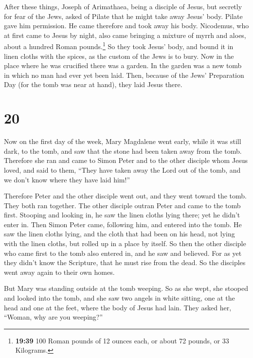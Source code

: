  After these things, Joseph of Arimathaea, being a
disciple of Jesus, but secretly for fear of the Jews, asked of Pilate
that he might take away Jesus' body. Pilate gave him permission. He came
therefore and took away his body.  Nicodemus, who at
first came to Jesus by night, also came bringing a mixture of myrrh and
aloes, about a hundred Roman pounds.\footnote{\textbf{19:39} 100 Roman
  pounds of 12 ounces each, or about 72 pounds, or 33 Kilograms.}
 So they took Jesus' body, and bound it in linen cloths
with the spices, as the custom of the Jews is to bury. 
Now in the place where he was crucified there was a garden. In the
garden was a new tomb in which no man had ever yet been laid.
 Then, because of the Jews' Preparation Day (for the tomb
was near at hand), they laid Jesus there.

\hypertarget{section-19}{%
\section{20}\label{section-19}}

 Now on the first day of the week, Mary Magdalene went
early, while it was still dark, to the tomb, and saw that the stone had
been taken away from the tomb.  Therefore she ran and came
to Simon Peter and to the other disciple whom Jesus loved, and said to
them, ``They have taken away the Lord out of the tomb, and we don't know
where they have laid him!''

 Therefore Peter and the other disciple went out, and they
went toward the tomb.  They both ran together. The other
disciple outran Peter and came to the tomb first. 
Stooping and looking in, he saw the linen cloths lying there; yet he
didn't enter in.  Then Simon Peter came, following him,
and entered into the tomb. He saw the linen cloths lying, 
and the cloth that had been on his head, not lying with the linen
cloths, but rolled up in a place by itself.  So then the
other disciple who came first to the tomb also entered in, and he saw
and believed.  For as yet they didn't know the Scripture,
that he must rise from the dead.  So the disciples went
away again to their own homes.

 But Mary was standing outside at the tomb weeping. So as
she wept, she stooped and looked into the tomb,  and she
saw two angels in white sitting, one at the head and one at the feet,
where the body of Jesus had lain.  They asked her,
``Woman, why are you weeping?''

